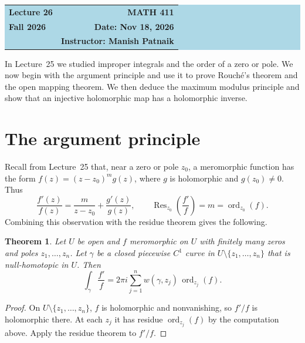 \documentclass[11pt]{article}
\theoremstyle{plain}
\newtheorem{theorem}{Theorem}[section]
\theoremstyle{definition}
\theoremstyle{boldremark}
\theoremstyle{remark}
\numberwithin{equation}{section}
\begin{document}
\begin{center}
  \colorbox{lightblue}{%
    \begin{minipage}{0.94\textwidth}
      \vspace{0.55em}
      \begin{tabular*}{\textwidth}{@{\extracolsep{\fill}}lr}
        {\color{courseblue}\bfseries\LARGE Lecture 26} &
        {\color{courseblue}\bfseries\LARGE MATH 411}\\[0.35em]
        \textbf{Fall 2026} & \textbf{Date: Nov 18, 2026}\\
        & \textbf{Instructor: Manish Patnaik}
      \end{tabular*}
      \vspace{0.45em}
    \end{minipage}}
\end{center}

\setcounter{tocdepth}{1}
\tableofcontents
\vspace{0.45em}

In Lecture~25 we studied improper integrals and the order of a zero or
pole. We now begin with the argument principle and use it to prove
Rouch\'e's theorem and the open mapping theorem. We then deduce the
maximum modulus principle and show that an injective holomorphic map
has a holomorphic inverse.

\section{The argument principle}
Recall from Lecture~25 that, near a zero or pole $z_0$, a meromorphic
function has the form $f(z)=(z-z_0)^m g(z)$, where $g$ is holomorphic and
$g(z_0)\ne0$. Thus
\[
 \frac{f'(z)}{f(z)}=\frac{m}{z-z_0}+\frac{g'(z)}{g(z)},\qquad
 \operatorname{Res}_{z_0}\!\left(\frac{f'}{f}\right)
 =m=\operatorname{ord}_{z_0}(f).
\]
Combining this observation with the residue theorem gives the following.

\begin{theorem}\label{thm:log-derivative}
Let $U$ be open and $f$ meromorphic on $U$ with finitely many zeros and
poles $z_1,\dots,z_n$. Let $\gamma$ be a closed piecewise $C^1$ curve in
$U\setminus\{z_1,\dots,z_n\}$ that is null-homotopic in $U$. Then
\[
 \int_\gamma\frac{f'}{f}=2\pi i\sum_{j=1}^{n}w(\gamma,z_j)\,
 \operatorname{ord}_{z_j}(f).
\]
\end{theorem}
\begin{proof}
On $U\setminus\{z_1,\dots,z_n\}$, $f$ is holomorphic and nonvanishing, so
$f'/f$ is holomorphic there. At each $z_j$ it has residue
$\operatorname{ord}_{z_j}(f)$ by the computation above. Apply the residue
theorem to $f'/f$.
\end{proof}
\end{document}
